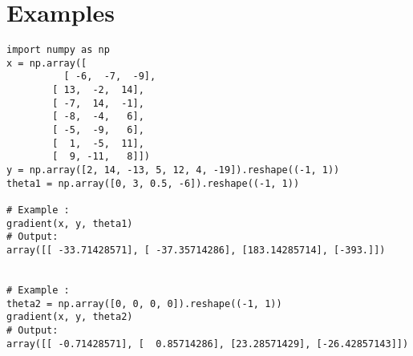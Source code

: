 \section*{Examples}
\begin{verbatim}
import numpy as np
x = np.array([
	      [ -6,  -7,  -9],
        [ 13,  -2,  14],
        [ -7,  14,  -1],
        [ -8,  -4,   6],
        [ -5,  -9,   6],
        [  1,  -5,  11],
        [  9, -11,   8]])
y = np.array([2, 14, -13, 5, 12, 4, -19]).reshape((-1, 1))
theta1 = np.array([0, 3, 0.5, -6]).reshape((-1, 1))

# Example :
gradient(x, y, theta1)
# Output:
array([[ -33.71428571], [ -37.35714286], [183.14285714], [-393.]])


# Example :
theta2 = np.array([0, 0, 0, 0]).reshape((-1, 1))
gradient(x, y, theta2)
# Output:
array([[ -0.71428571], [  0.85714286], [23.28571429], [-26.42857143]])
\end{verbatim}
